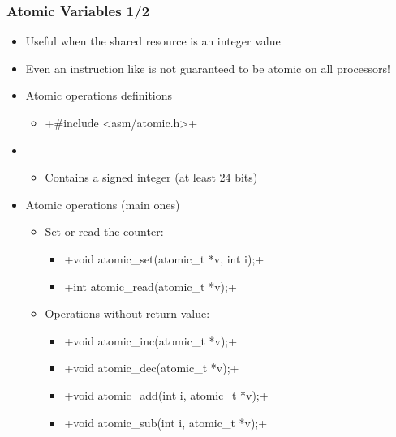 \begin{frame}[fragile]
  \frametitle{Atomic Variables 1/2}
  \begin{itemize}
  \item Useful when the shared resource is an integer value
  \item Even an instruction like  is not guaranteed to be
    atomic on all processors!
  \item Atomic operations definitions
    \begin{itemize}
    \item {}+#include <asm/atomic.h>+
    \end{itemize}
  \item {}
    \begin{itemize}
    \item Contains a signed integer (at least 24 bits)
    \end{itemize}
  \item Atomic operations (main ones)
    \begin{itemize}
    \item Set or read the counter:
      \begin{itemize}
      \item {}+void atomic_set(atomic_t *v, int i);+
      \item {}+int atomic_read(atomic_t *v);+
      \end{itemize}
    \item Operations without return value:
      \begin{itemize}
      \item {}+void atomic_inc(atomic_t *v);+
      \item {}+void atomic_dec(atomic_t *v);+
      \item {}+void atomic_add(int i, atomic_t *v);+
      \item {}+void atomic_sub(int i, atomic_t *v);+
      \end{itemize}
    \end{itemize}
  \end{itemize}
\end{frame}

